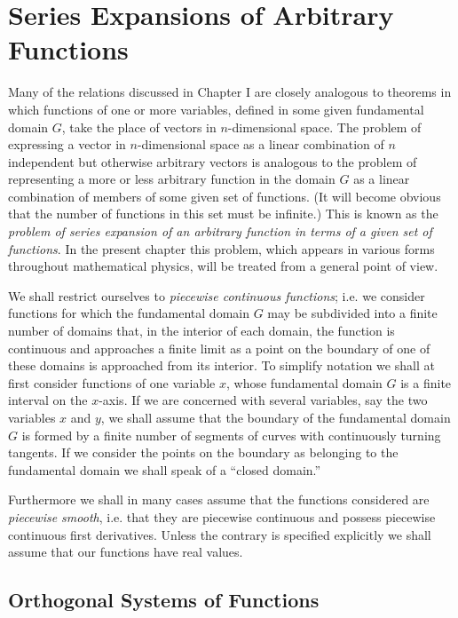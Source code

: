 \chapter{Series Expansions of Arbitrary Functions}
Many of the relations discussed in Chapter I are closely analogous to theorems in which functions of one or more variables, defined in some given fundamental domain $G$, take the place of vectors in $n$-dimensional space. The problem of expressing a vector in $n$-dimensional space as a linear combination of $n$ independent but otherwise arbitrary vectors is analogous to the problem of representing a more or less arbitrary function in the domain $G$ as a linear combination of members of some given set of functions. (It will become obvious that the number of functions in this set must be infinite.) This is known as the \emph{problem of series expansion of an arbitrary function in terms of a given set of functions}. In the present chapter this problem, which appears in various forms throughout mathematical physics, will be treated from a general point of view.

We shall restrict ourselves to \emph{piecewise continuous functions}; i.e. we consider functions for which the fundamental domain $G$ may be subdivided into a finite number of domains that, in the interior of each domain, the function is continuous and approaches a finite limit as a point on the boundary of one of these domains is approached from its interior. To simplify notation we shall at first consider functions of one variable $x$, whose fundamental domain $G$ is a finite interval on the $x$-axis. If we are concerned with several variables, say the two variables $x$ and $y$, we shall assume that the boundary of the fundamental domain $G$ is formed by a finite number of segments of curves with continuously turning tangents. If we consider the points on the boundary as belonging to the fundamental domain we shall speak of a ``closed domain.''

Furthermore we shall in many cases assume that the functions considered are \emph{piecewise smooth}, i.e. that they are piecewise continuous and possess piecewise continuous first derivatives. Unless the contrary is specified explicitly we shall assume that our functions have real values.

\section{Orthogonal Systems of Functions}

